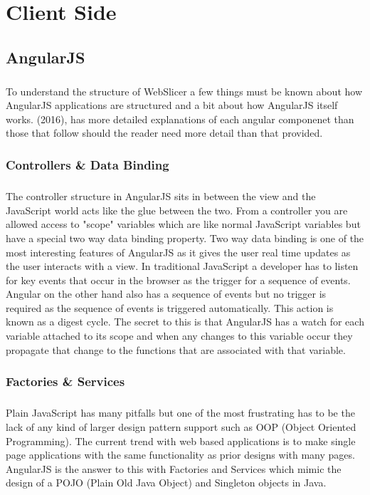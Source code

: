 \chapter{Client Side}

\section{AngularJS}
\paragraph{}
To understand the structure of WebSlicer a few things must be known about how AngularJS applications are structured and a bit about how AngularJS itself works.
\cite{meding-2016} (2016), has more detailed explanations of each angular componenet than those that follow should the reader need more detail than that provided.

\subsection{Controllers \& Data Binding}
\paragraph{}
The controller structure in AngularJS sits in between the view and the JavaScript world acts like the glue between the two.
From a controller you are allowed access to "scope" variables which are like normal JavaScript variables but have a special two way data binding property.
Two way data binding is one of the most interesting features of AngularJS as it gives the user real time updates as the user interacts with a view.
In traditional JavaScript a developer has to listen for key events that occur in the browser as the trigger for a sequence of events.
Angular on the other hand also has a sequence of events but no trigger is required as the sequence of events is triggered automatically.
This action is known as a digest cycle.
The secret to this is that AngularJS has a watch for each variable attached to its scope and when any changes to this variable occur they propagate that change to the functions that are associated with that variable.

\subsection{Factories \& Services}
\paragraph{}
Plain JavaScript has many pitfalls but one of the most frustrating has to be the lack of any kind of larger design pattern support such as OOP (Object Oriented Programming).
The current trend with web based applications is to make single page applications with the same functionality as prior designs with many pages.
AngularJS is the answer to this with Factories and Services which mimic the design of a POJO (Plain Old Java Object) and Singleton objects in Java.

